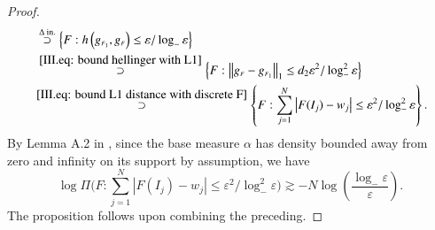 \begin{proof}
\begin{align*}
& \: \stackrel{\Delta \: \text{in.}}{\supset}\left\{F: h\left(g_{\scriptscriptstyle{F_{\scaleto{1}{3.2pt}}}}, g_{\scriptscriptstyle{F}}\right) \leq \varepsilon / \log_{-}\varepsilon \right\} \\
& \: \stackrel{\eqref{III.eq: bound hellinger with L1}}{\supset}\left\{F:\left\|g_{\scriptscriptstyle{F}}-g_{\scriptscriptstyle{F_{\scaleto{1}{3.2pt}}}}\right\|_1 \leq d_2 \varepsilon^2 / \log^2_{-}\varepsilon \right\} \\
& \stackrel{\eqref{III.eq: bound L1 distance with discrete F}}{\supset}\left\{F: \sum_{j=1}^N\left|F(I_j)-w_j\right| \leq \varepsilon^2/ \log^2_{-}\varepsilon\right\}.
\end{align*}
By Lemma A.2 in \cite{23}, since the base measure $\alpha$ has density bounded away from zero and infinity on its support by assumption, we have
$$
\log \Pi\bigg(F: \sum_{j=1}^N\left|F(I_j)-w_j\right| \leq \varepsilon^2 / \log^2_{-}\varepsilon\bigg) \gtrsim-N \log \left(\frac{ \log_{-}\varepsilon}{\varepsilon}\right).
$$
The proposition follows upon combining the preceding.
\end{proof}

